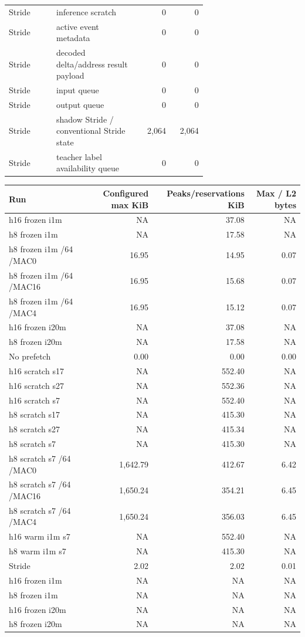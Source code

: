 \documentclass[10pt]{article}
\begin{document}
\begin{center}
\begin{longtable}{p{0.24\linewidth}p{0.43\linewidth}rr}
Stride & inference scratch & 0 & 0 \\
Stride & active event metadata & 0 & 0 \\
Stride & decoded delta/address result payload & 0 & 0 \\
Stride & input queue & 0 & 0 \\
Stride & output queue & 0 & 0 \\
Stride & shadow Stride / conventional Stride state & 2,064 & 2,064 \\
Stride & teacher label availability queue & 0 & 0 \\
\bottomrule
\end{longtable}
\end{center}

\begin{center}
\scriptsize
\begin{longtable}{lrrr}
\toprule
Run & Configured max KiB & Peaks/reservations KiB & Max / L2 bytes \\
\midrule
\endhead
h16 frozen i1m & NA & 37.08 & NA \\
h8 frozen i1m & NA & 17.58 & NA \\
h8 frozen i1m /64 /MAC0 & 16.95 & 14.95 & 0.07 \\
h8 frozen i1m /64 /MAC16 & 16.95 & 15.68 & 0.07 \\
h8 frozen i1m /64 /MAC4 & 16.95 & 15.12 & 0.07 \\
h16 frozen i20m & NA & 37.08 & NA \\
h8 frozen i20m & NA & 17.58 & NA \\
No prefetch & 0.00 & 0.00 & 0.00 \\
h16 scratch s17 & NA & 552.40 & NA \\
h16 scratch s27 & NA & 552.36 & NA \\
h16 scratch s7 & NA & 552.40 & NA \\
h8 scratch s17 & NA & 415.30 & NA \\
h8 scratch s27 & NA & 415.34 & NA \\
h8 scratch s7 & NA & 415.30 & NA \\
h8 scratch s7 /64 /MAC0 & 1,642.79 & 412.67 & 6.42 \\
h8 scratch s7 /64 /MAC16 & 1,650.24 & 354.21 & 6.45 \\
h8 scratch s7 /64 /MAC4 & 1,650.24 & 356.03 & 6.45 \\
h16 warm i1m s7 & NA & 552.40 & NA \\
h8 warm i1m s7 & NA & 415.30 & NA \\
Stride & 2.02 & 2.02 & 0.01 \\
h16 frozen i1m & NA & NA & NA \\
h8 frozen i1m & NA & NA & NA \\
h16 frozen i20m & NA & NA & NA \\
h8 frozen i20m & NA & NA & NA \\
\bottomrule
\end{longtable}
\end{center}
\end{document}
